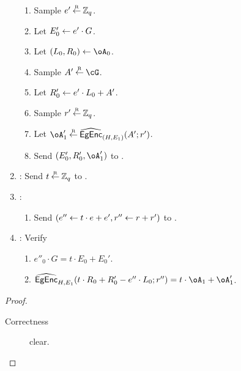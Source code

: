 \begin{description}
\begin{description}
\begin{protocol}
\begin{enumerate}
			\begin{enumerate}
		
				
				\item Sample $e'\mathbin{\stackrel{\mbox{\tiny R}}{\leftarrow}}  {\mathbb Z}_q$.
				
				\item Let $E'_0 \leftarrow e' \cdot G$.
				
				\item Let $(L_0,R_0) \asn \oA_0$.
				
				
			 \item Sample $A' \getsr \cG$.
			 
				
					\item Let $R_0' \leftarrow e' \cdot  L_0  +A' $.
				
				
					\item Sample $r'\mathbin{\stackrel{\mbox{\tiny R}}{\leftarrow}}  {\mathbb Z}_q$.
					
				\item  Let  $\oA_1' \getsr \wEgEnc_{(H,E_1)}(A';r')$.
				
				
				
				
				
				
				\item Send $(E_0',R_0',\oA_1')$ to \Vc.
			\end{enumerate}
			
			\item \Vc: Send $t\mathbin{\stackrel{\mbox{\tiny R}}{\leftarrow}} {\mathbb Z}_q$ to \Pc.
			
			\item \Pc: 
			\begin{enumerate}
			
				
				\item Send $(e'' \leftarrow t\cdot e + e',r'' \leftarrow r + r')$ to \Vc. 
			\end{enumerate}
		
		\item \Vc: Verify  
		
			\begin{enumerate}
			\item $e''_0\cdot G = t\cdot E_0 + E_0'$.
			
			\item  $\wEgEnc_{H,E_1}(t\cdot R_0 + R_0' - e'' \cdot L_0;r'') = t\cdot \oA_1 + \oA_1'$.
		\end{enumerate}
		\end{enumerate}
		
		
	\end{protocol}
	
	\begin{proof}
	\begin{description}
		\item[Correctness] clear.
		

\end{description}
\end{proof}
\end{description}
\end{description}
